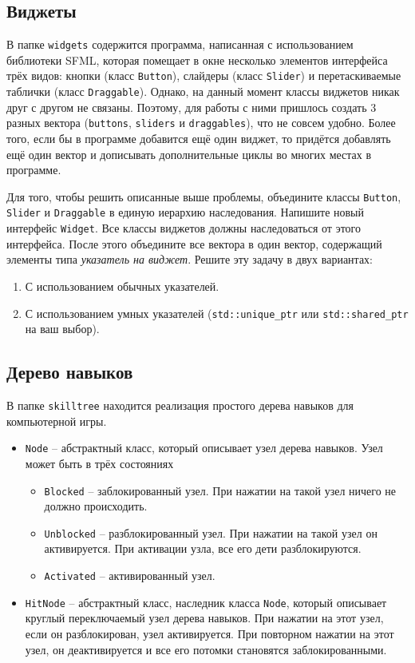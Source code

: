 \documentclass{article}
\begin{document}
\subsection{Виджеты}
В папке \texttt{widgets} содержится программа, написанная с использованием библиотеки SFML, которая помещает в окне несколько элементов интерфейса трёх видов: кнопки (класс \texttt{Button}), слайдеры (класс \texttt{Slider}) и перетаскиваемые таблички (класс \texttt{Draggable}). Однако, на данный момент классы виджетов никак друг с другом не связаны. Поэтому, для работы с ними пришлось создать 3 разных вектора (\texttt{buttons}, \texttt{sliders} и \texttt{draggables}), что не совсем удобно. Более того, если бы в программе добавится ещё один виджет, то придётся добавлять ещё один вектор и дописывать дополнительные циклы во многих местах в программе.

Для того, чтобы решить описанные выше проблемы, объедините классы \texttt{Button}, \texttt{Slider} и \texttt{Draggable} в единую иерархию наследования. Напишите новый интерфейс \texttt{Widget}. Все классы виджетов должны наследоваться от этого интерфейса. После этого объедините все вектора в один вектор, содержащий элементы типа \textit{указатель на виджет}. Решите эту задачу в двух вариантах:

\begin{enumerate}
\item С использованием обычных указателей.
\item С использованием умных указателей (\texttt{std::unique\_ptr} или \texttt{std::shared\_ptr} на ваш выбор).
\end{enumerate}

\newpage
\subsection{Дерево навыков}
В папке \texttt{skilltree} находится реализация простого дерева навыков для компьютерной игры.
\begin{itemize}
\item \texttt{Node} -- абстрактный класс, который описывает узел дерева навыков. Узел может быть в трёх состояниях
\begin{itemize}
\item \texttt{Blocked} -- заблокированный узел. При нажатии на такой узел ничего не должно происходить.
\item \texttt{Unblocked} -- разблокированный узел. При нажатии на такой узел он активируется. При активации узла, все его дети разблокируются.
\item \texttt{Activated} -- активированный узел.
\end{itemize}
\item \texttt{HitNode} -- абстрактный класс, наследник класса \texttt{Node}, который описывает круглый переключаемый узел дерева навыков. При нажатии на этот узел, если он разблокирован, узел активируется. При повторном нажатии на этот узел, он деактивируется и все его потомки становятся заблокированными.

\end{itemize}
\end{document}

